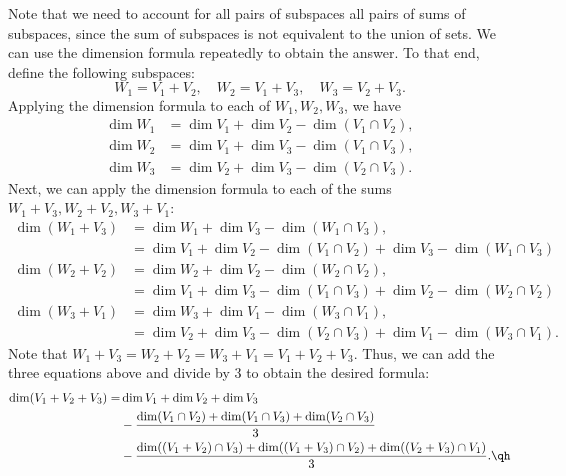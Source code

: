 \begin{sol}
    Note that we need to account for all pairs of subspaces all pairs of sums of subspaces, since the sum of subspaces is not equivalent to the union of sets. We can use the dimension formula repeatedly to obtain the answer. To that end, define the following subspaces:
    \[W_1 = V_1 + V_2, \quad W_2 = V_1 + V_3, \quad W_3 = V_2 + V_3.\]
    Applying the dimension formula to each of $W_1, W_2, W_3$, we have
    \begin{align*}
        \dim W_1 & = \dim V_1 + \dim V_2 - \dim(V_1 \cap V_2), \\
        \dim W_2 & = \dim V_1 + \dim V_3 - \dim(V_1 \cap V_3), \\
        \dim W_3 & = \dim V_2 + \dim V_3 - \dim(V_2 \cap V_3).
    \end{align*}
    Next, we can apply the dimension formula to each of the sums $W_1 + V_3, W_2 + V_2, W_3 + V_1$:
    \begin{align*}
        \dim(W_1 + V_3) & = \dim W_1 + \dim V_3 - \dim(W_1 \cap V_3), \\
        & = \dim V_1 + \dim V_2 - \dim(V_1 \cap V_2) + \dim V_3 - \dim(W_1 \cap V_3) \\
        \dim(W_2 + V_2) & = \dim W_2 + \dim V_2 - \dim(W_2 \cap V_2), \\
        & = \dim V_1 + \dim V_3 - \dim(V_1 \cap V_3) + \dim V_2 - \dim(W_2 \cap V_2) \\
        \dim(W_3 + V_1) & = \dim W_3 + \dim V_1 - \dim(W_3 \cap V_1), \\
        & = \dim V_2 + \dim V_3 - \dim(V_2 \cap V_3) + \dim V_1 - \dim(W_3 \cap V_1).
    \end{align*}
    Note that $W_1 + V_3 = W_2 + V_2 = W_3 + V_1 = V_1 + V_2 + V_3$. Thus, we can add the three equations above and divide by $3$ to obtain the desired formula:
    \begin{align*}
        \dim(V_1 + V_2 + V_3) = & \dim V_1 + \dim V_2 + \dim V_3 \\
        &- \frac{\dim(V_1 \cap V_2) + \dim(V_1 \cap V_3) + \dim(V_2 \cap V_3)}{3} \\
        &- \frac{\dim((V_1 + V_2) \cap V_3) + \dim((V_1 + V_3) \cap V_2) + \dim((V_2 + V_3) \cap V_1)}{3}. \qh
    \end{align*}
\end{sol}